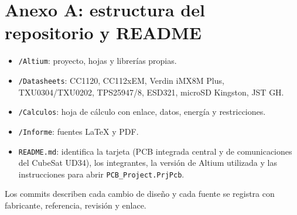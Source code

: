 \documentclass[11pt,letterpaper]{article}
\begin{document}
\section*{Anexo A: estructura del repositorio y README}
\begin{itemize}
\item \texttt{/Altium}: proyecto, hojas y librerías propias.
\item \texttt{/Datasheets}: CC1120, CC112xEM, Verdin iMX8M Plus, TXU0304/TXU0202, TPS25947/8, ESD321, microSD Kingston, JST GH.
\item \texttt{/Calculos}: hoja de cálculo con enlace, datos, energía y restricciones.
\item \texttt{/Informe}: fuentes LaTeX y PDF.
\item \texttt{README.md}: identifica la tarjeta (PCB integrada central y de comunicaciones del CubeSat UD34), los integrantes, la versión de Altium utilizada y las instrucciones para abrir \texttt{PCB\_Project.PrjPcb}.
\end{itemize}
Los commits describen cada cambio de diseño y cada fuente se registra con fabricante, referencia, revisión y enlace.
\end{document}

